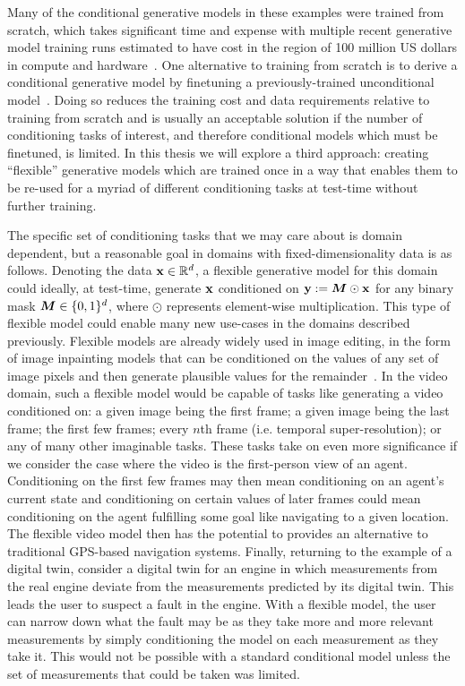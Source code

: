 Many of the conditional generative models in these examples were trained from scratch, which takes significant time and expense with multiple recent generative model training runs estimated to have cost in the region of 100 million US dollars in compute and hardware~\citep{knight2023openai,stanford2024artificial}. One alternative to training from scratch is to derive a conditional generative model by finetuning a previously-trained unconditional model~\citep{tian2023control,sheynin2023emu}. Doing so reduces the training cost and data requirements relative to training from scratch and is usually an acceptable solution if the number of conditioning tasks of interest, and therefore conditional models which must be finetuned, is limited. In this thesis we will explore a third approach: creating ``flexible'' generative models which are trained once in a way that enables them to be re-used for a myriad of different conditioning tasks at test-time without further training.

The specific set of conditioning tasks that we may care about is domain dependent, but a reasonable goal in domains with fixed-dimensionality data is as follows. Denoting the data ${\mathbf{x}} \in \mathbb{R}^d$, a flexible generative model for this domain could ideally, at test-time, generate ${\mathbf{x}}$ conditioned on ${\mathbf{y}} := {\bm{M}} \odot {\mathbf{x}}$ for any binary mask ${\bm{M}} \in \{0,1\}^d$, where $\odot$ represents element-wise multiplication. This type of flexible model could enable many new use-cases in the domains described previously. Flexible models are already widely used in image editing, in the form of image inpainting models that can be conditioned on the values of any set of image pixels and then generate plausible values for the remainder~\citep{rombach2022high,zhao2021large,harvey2021conditional}. In the video domain, such a flexible model would be capable of tasks like generating a video conditioned on: a given image being the first frame; a given image being the last frame; the first few frames; every $n$th frame (i.e. temporal super-resolution); or any of many other imaginable tasks. These tasks take on even more significance if we consider the case where the video is the first-person view of an agent. Conditioning on the first few frames may then mean conditioning on an agent's current state and conditioning on certain values of later frames could mean conditioning on the agent fulfilling some goal like navigating to a given location. The flexible video model then has the potential to provides an alternative to traditional GPS-based navigation systems. Finally, returning to the example of a digital twin, consider a digital twin for an engine in which measurements from the real engine deviate from the measurements predicted by its digital twin. This leads the user to suspect a fault in the engine. With a flexible model, the user can narrow down what the fault may be as they take more and more relevant measurements by simply conditioning the model on each measurement as they take it. This would not be possible with a standard conditional model unless the set of measurements that could be taken was limited.

